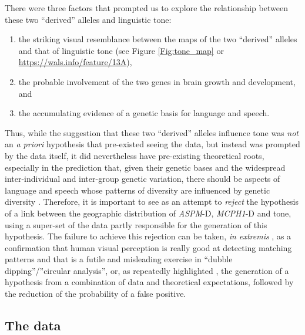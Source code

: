 \documentclass[twoside,twocolumn]{article}
\begin{document}
There were three factors that prompted us to explore the relationship between these two ``derived'' alleles and linguistic tone:

\begin{enumerate}[label={\alph*)}]
	\item the striking visual resemblance between the maps of the two ``derived'' alleles and that of linguistic tone (see Figure \ref{Fig:tone_map} or \url{https://wals.info/feature/13A}),
	\item the probable involvement of the two genes in brain growth and development, and
	\item the accumulating evidence of a genetic basis for language and speech.
\end{enumerate}

Thus, while the suggestion that these two ``derived'' alleles influence tone was \emph{not} an \textit{a priori} hypothesis that pre-existed seeing the data, but instead was prompted by the data itself, it did nevertheless have pre-existing theoretical roots, especially in the prediction that, given their genetic bases and the widespread inter-individual and inter-group genetic variation, there should be aspects of language and speech whose patterns of diversity are influenced by genetic diversity \citep{dediu_msc_2002,dediu_phd_2007}.
Therefore, it is important to see \citet{dediu_ladd_2007} as an attempt to \emph{reject} the hypothesis of a link between the geographic distribution of \textit{ASPM}-D, \textit{MCPH1}-D and tone, using a super-set of the data partly responsible for the generation of this hypothesis.
The failure to achieve this rejection can be taken, \textit{in extremis} \citep{collins_tone_2016}, as a confirmation that human visual perception is really good at detecting matching patterns and that \citet{dediu_ladd_2007} is a futile and misleading exercise in ``dubble dipping''/''circular analysis'', or, as repeatedly highlighted \citep{dediu_ladd_2007,dediu_phd_2007,ladd_bioling_2008}, the generation of a hypothesis from a combination of data and theoretical expectations, followed by the reduction of the probability of a false positive.

\subsection{The data}
\end{document}
